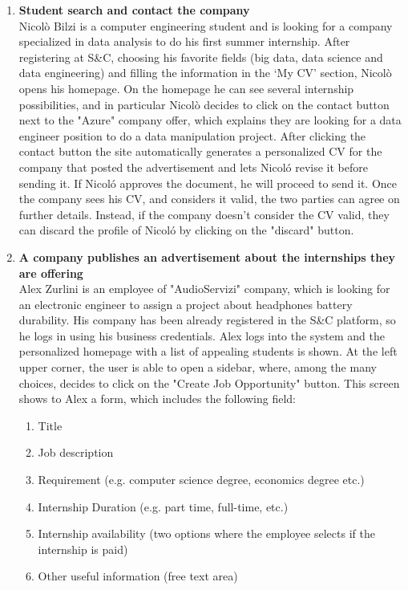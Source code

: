 \begin{enumerate}
      \item \textbf{Student search and contact the company}\\
     Nicolò Bilzi is a computer engineering student and is looking for a company specialized in data analysis to do his first summer internship. After registering at S\&C, choosing his favorite fields (big data, data science and data engineering) and filling the information in the ‘My CV’ section, Nicolò opens his homepage.
     On the homepage he can see several internship possibilities, and in particular Nicolò decides to click on the contact button next to the "Azure" company offer, which explains they are looking for a data engineer position to do a data manipulation project. After clicking the contact button the site automatically generates a personalized CV for the company that posted the advertisement and lets Nicoló revise it before sending it. If Nicoló approves the document, he will proceed to send it. Once the company sees his CV, and considers it valid, the two parties can agree on further details. Instead, if the company doesn't consider the CV valid, they can discard the profile of Nicoló by clicking on the "discard" button.
      
      \item \textbf{A company publishes an advertisement about the internships they are offering}\\
    Alex Zurlini is an employee of "AudioServizi" company, which is looking for an electronic engineer to assign a project about headphones battery durability.
    His company has been already registered in the S\&C platform, so he logs in using his business credentials.
    Alex logs into the system and the personalized homepage with a list of appealing students is shown.
    At the left upper corner, the user is able to open a sidebar, where, among the many choices, decides to click on the "Create Job Opportunity" button. 
    This screen shows to Alex a form, which includes the following field:
    \begin{enumerate}
      \item Title 
      \item Job description
      \item Requirement (e.g. computer science degree, economics degree etc.)
      \item Internship Duration (e.g. part time, full-time, etc.)
      \item Internship availability (two options where the employee selects if the internship is paid)
      \item Other useful information (free text area)
    \end{enumerate}    


\end{enumerate}
